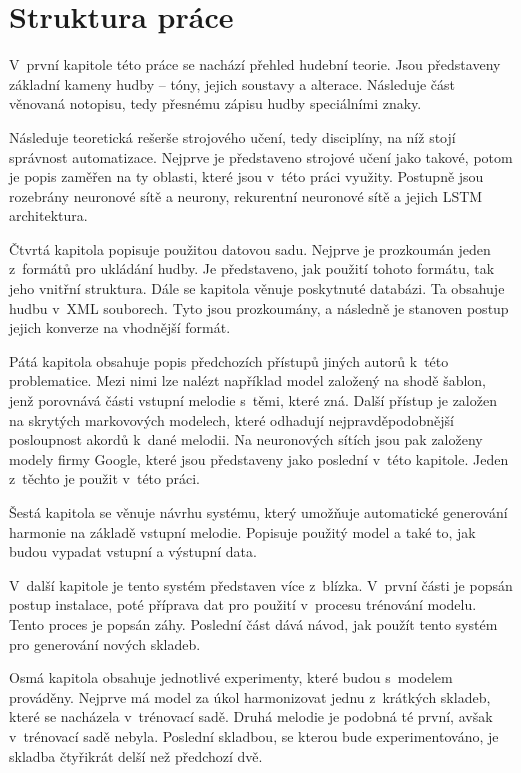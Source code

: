 \section{Struktura práce}
V~první kapitole této práce se nachází přehled hudební teorie.
Jsou představeny základní kameny hudby -- tóny, jejich soustavy a alterace.
Následuje část věnovaná notopisu,
tedy přesnému zápisu hudby speciálními znaky.
\par
Následuje teoretická rešerše strojového učení,
tedy disciplíny, na níž stojí správnost automatizace.
Nejprve je představeno strojové učení jako takové,
potom je popis zaměřen na ty oblasti, 
které jsou v~této práci využity.
Postupně jsou rozebrány neuronové sítě a neurony,
rekurentní neuronové sítě a jejich LSTM architektura.
\par
Čtvrtá kapitola popisuje použitou datovou sadu.
Nejprve je prozkoumán jeden z~formátů pro ukládání hudby.
Je představeno, jak použití tohoto formátu, tak jeho vnitřní struktura.
Dále se kapitola věnuje poskytnuté databázi.
Ta obsahuje hudbu v~XML souborech.
Tyto jsou prozkoumány, a následně je stanoven postup jejich konverze na vhodnější formát.

Pátá kapitola obsahuje popis předchozích přístupů jiných autorů k~této problematice.
Mezi nimi lze nalézt například model založený na shodě šablon, 
jenž porovnává části vstupní melodie s~těmi, které zná.
Další přístup je založen na skrytých markovových modelech, 
které odhadují nejpravděpodobnější posloupnost akordů k~dané melodii.
Na neuronových sítích jsou pak založeny modely firmy Google,
které jsou představeny jako poslední v~této kapitole.
Jeden z~těchto je použit v~této práci.
\par

Šestá kapitola se věnuje návrhu systému,
který umožňuje automatické generování harmonie na základě vstupní melodie.
Popisuje použitý model a také to, jak budou vypadat vstupní a výstupní data.
\par

V~další kapitole je tento systém představen více z~blízka.
V~první části je popsán postup instalace, 
poté příprava dat pro použití v~procesu trénování modelu.
Tento proces je popsán záhy.
Poslední část dává návod, jak použít tento systém pro generování nových skladeb.
\par

Osmá kapitola obsahuje jednotlivé experimenty, 
které budou s~modelem prováděny.
Nejprve má model za úkol harmonizovat jednu z~krátkých skladeb,
které se nacházela v~trénovací sadě.
Druhá melodie je podobná té první, 
avšak v~trénovací sadě nebyla.
Poslední skladbou, se kterou bude experimentováno,
je skladba čtyřikrát delší než předchozí dvě.
\par

